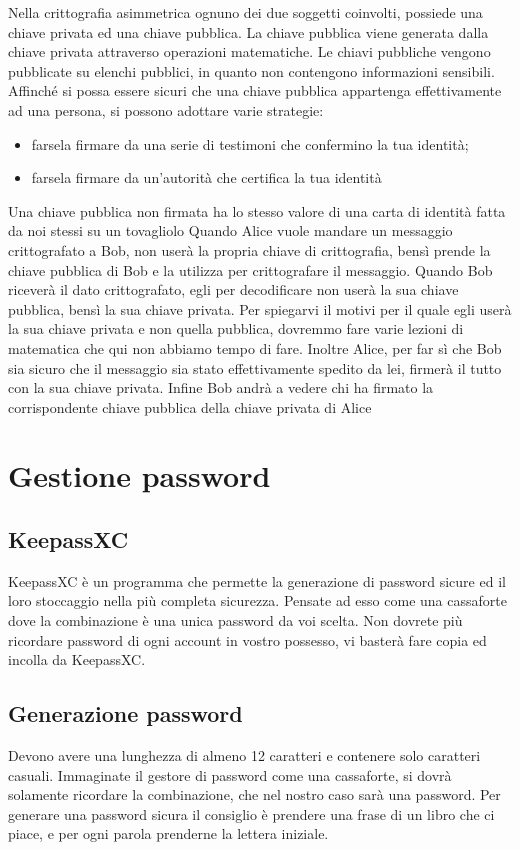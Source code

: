 \documentclass[italian,a4paper,12pt,oneside]{report}
\begin{document}
Nella crittografia asimmetrica ognuno dei due soggetti
coinvolti, possiede una chiave privata ed una chiave pubblica.
La chiave pubblica viene generata dalla chiave privata attraverso operazioni matematiche.
Le chiavi pubbliche vengono pubblicate su elenchi pubblici, in quanto non contengono informazioni
sensibili. Affinché si possa essere sicuri che una chiave pubblica appartenga effettivamente ad una
persona, si possono adottare varie strategie:
\begin{itemize}
 \item farsela firmare da una serie di testimoni che confermino la tua identità;
 \item farsela firmare da un'autorità che certifica la tua identità
\end{itemize}
Una chiave pubblica non firmata ha lo stesso valore di una carta di identità
fatta da noi stessi su un tovagliolo
Quando Alice vuole mandare un messaggio crittografato a Bob, non userà la propria
chiave di crittografia, bensì prende la chiave pubblica di Bob e la utilizza per
crittografare il messaggio.
Quando Bob riceverà il dato crittografato, egli per decodificare non userà la sua chiave pubblica,
bensì la sua chiave privata. Per spiegarvi il motivi per il quale egli userà la sua chiave privata e
non quella pubblica, dovremmo fare varie lezioni di matematica che qui non abbiamo tempo di fare.
Inoltre Alice, per far sì che Bob sia sicuro che il messaggio sia stato
effettivamente spedito da lei, firmerà il tutto con la sua chiave privata.
Infine Bob andrà a vedere chi ha firmato la corrispondente chiave pubblica
della chiave privata di Alice

\section{Gestione password}
\subsection{KeepassXC}
KeepassXC è un programma che permette la generazione di password sicure
ed il loro stoccaggio nella più completa sicurezza. Pensate ad esso come una cassaforte
dove la combinazione è una unica password da voi scelta. Non dovrete più ricordare password
di ogni account in vostro possesso, vi basterà fare copia ed incolla da KeepassXC.
\subsection{Generazione password}
Devono avere una lunghezza di almeno 12 caratteri e contenere solo caratteri
casuali. Immaginate il gestore di password come una cassaforte, si dovrà solamente
ricordare la combinazione, che nel nostro caso sarà una password.
Per generare una password sicura il consiglio è prendere una frase di un libro
che ci piace, e per ogni parola prenderne la lettera iniziale.
\end{document}
